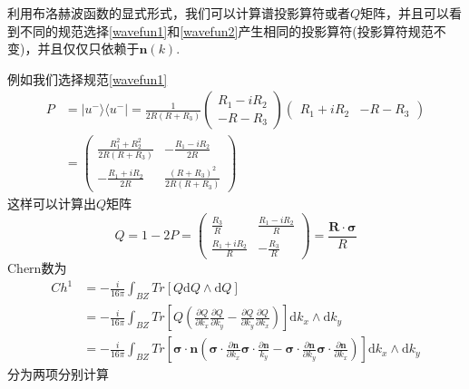 \documentclass{article}
\numberwithin{equation}{subsection}
\begin{document}
利用布洛赫波函数的显式形式，我们可以计算谱投影算符或者$Q$矩阵，并且可以看到不同的规范选择\eqref{wavefun1}和\eqref{wavefun2}产生相同的投影算符(投影算符规范不变)，并且仅仅只依赖于$\mathbf{n}(k)$.

例如我们选择规范\eqref{wavefun1}
\begin{equation*}
    \begin{split}
        P&=|u^-\rangle\langle u^-|=\frac{1}{2R(R+R_3)}\begin{pmatrix}
            R_1-iR_2\\
            -R-R_3
        \end{pmatrix}\begin{pmatrix}
            R_1+iR_2&-R-R_3
        \end{pmatrix}\\
        &=\begin{pmatrix}
            \frac{R_1^2+R_2^2}{2R(R+R_3)}&-\frac{R_1-iR_2}{2R}\\
            -\frac{R_1+iR_2}{2R}&\frac{(R+R_3)^2}{2R(R+R_3)}
        \end{pmatrix}
    \end{split}
\end{equation*}
这样可以计算出$Q$矩阵
\begin{equation}
    Q=1-2P=\begin{pmatrix}
        \frac{R_3}{R}&\frac{R_1-iR_2}{R}\\
        \frac{R_1+iR_2}{R}&-\frac{R_3}{R}
    \end{pmatrix}=\frac{\mathbf{R}\cdot \bm{\sigma}}{R}
\end{equation}
Chern数为
\begin{equation*}
    \begin{split}
        Ch^1&=-\frac{i}{16\pi}\int_{BZ}Tr[Q\mathrm{d}Q\wedge \mathrm{d}Q]\\
        &=-\frac{i}{16\pi}\int_{BZ}Tr[Q(\frac{\partial Q}{\partial k_x}\frac{\partial Q}{\partial k_y}-\frac{\partial Q}{\partial k_y}\frac{\partial Q}{\partial k_x})]\mathrm{d}k_x\wedge \mathrm{d}k_y\\
        &=-\frac{i}{16\pi}\int_{BZ}Tr[\bm{\sigma}\cdot\mathbf{n}(\bm{\sigma}\cdot\frac{\partial\mathbf{n}}{\partial k_x}\bm{\sigma}\cdot\frac{\partial\mathbf{n}}{k_y}-\bm{\sigma}\cdot\frac{\partial\mathbf{n}}{\partial k_y}\bm{\sigma}\cdot\frac{\partial\bm{n}}{\partial k_x})]\mathrm{d}k_x\wedge\mathrm{d}k_y
    \end{split}
\end{equation*}
分为两项分别计算
\end{document}
